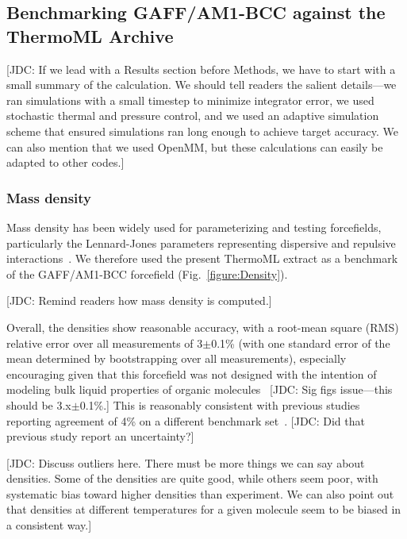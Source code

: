 \documentclass[aps,pre,twocolumn,nofootinbib,superscriptaddress,linenumbers]{revtex4-1}
\begin{document}

\subsection{Benchmarking GAFF/AM1-BCC against the ThermoML Archive}

{\color{red}[JDC: If we lead with a Results section before Methods, we have to start with a small summary of the calculation.
We should tell readers the salient details---we ran simulations with a small timestep to minimize integrator error, we used stochastic thermal and pressure control, and we used an adaptive simulation scheme that ensured simulations ran long enough to achieve target accuracy.  We can also mention that we used OpenMM, but these calculations can easily be adapted to other codes.]}

\subsubsection{Mass density}

Mass density has been widely used for parameterizing and testing forcefields, particularly the Lennard-Jones parameters representing dispersive and repulsive interactions~\cite{jorgensen1983comparison, jorgensen1984optimized}.
We therefore used the present ThermoML extract as a benchmark of the GAFF/AM1-BCC forcefield (Fig.~\ref{figure:Density}).  

{\color{red}[JDC: Remind readers how mass density is computed.]}

Overall, the densities show reasonable accuracy, with a root-mean square (RMS) relative error over all measurements of 3$\pm$0.1\% (with one standard error of the mean determined by bootstrapping over all measurements), especially encouraging given that this forcefield was not designed with the intention of modeling bulk liquid properties of organic molecules~\cite{gaff}
{\color{red}[JDC: Sig figs issue---this should be 3.x$\pm$0.1\%.]}
This is reasonably consistent with previous studies reporting agreement of 4\% on a different benchmark set~\cite{caleman2011force}.
{\color{red}[JDC: Did that previous study report an uncertainty?]}

{\color{red}[JDC: Discuss outliers here.  There must be more things we can say about densities.  Some of the densities are quite good, while others seem poor, with systematic bias toward higher densities than experiment.  We can also point out that densities at different temperatures for a given molecule seem to be biased in a consistent way.]}
\end{document}
